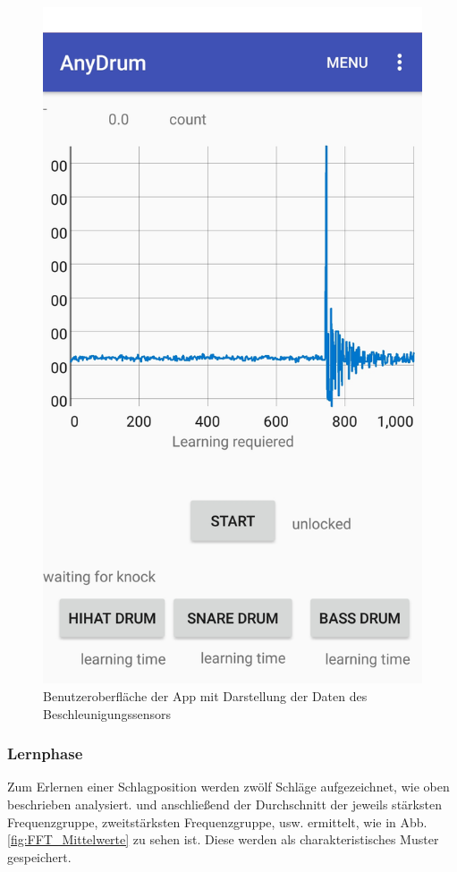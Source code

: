 \begin{figure}[H]
	\centering
	\includegraphics[scale=0.2]{figures/guiA.jpeg}
	\caption{Benutzeroberfläche der App mit Darstellung der Daten des Beschleunigungssensors}
	\label{fig:guiA}
\end{figure}


\subsubsection*{Lernphase}
Zum Erlernen einer Schlagposition werden zwölf Schläge aufgezeichnet, wie oben beschrieben analysiert. und anschließend der Durchschnitt der jeweils stärksten Frequenzgruppe, zweitstärksten Frequenzgruppe, usw. ermittelt, wie in Abb. \ref{fig:FFT_Mittelwerte} zu sehen ist. Diese werden als charakteristisches Muster gespeichert.

